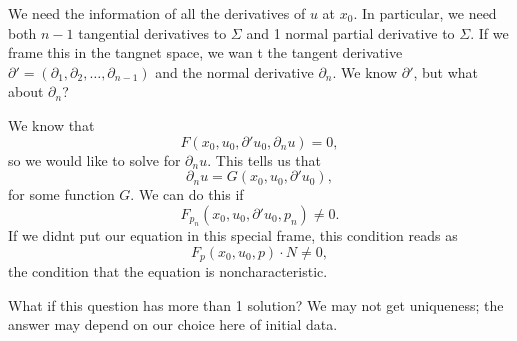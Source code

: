 We need the information of all the derivatives of $u$ at $x_0$. In particular, we need both $n-1$ tangential derivatives to $\Sigma$ and 1 normal partial derivative to $\Sigma$. If we frame this in the tangnet space, we wan t the tangent derivative $\partial'=(\partial_1, \partial_2, \ldots,\partial_{n-1} )$ and the normal derivative $\partial_n$. We know $\partial'$, but what about $\partial_n$? 
\begin{figure}[H]
    \centering
\end{figure}
We know that 
\[
    F(x_0, u_0 , \partial'u_0 , \partial_n u) = 0,
\]
so we would like to solve for $\partial_n u$. This tells us that 
\[
    \partial_n u = G(x_0, u_0, \partial'u_0),
\]
for some function $G$. We can do this if 
\[
    F_{p_n}(x_0, u_0, \partial' u_0, p_n) \neq 0.
\]
If we didnt put our equation in this special frame, this condition reads as 
\[
    F_p(x_0,u_0,p)\cdot N \neq 0,
\]
the condition that the equation is noncharacteristic.

\begin{remark}
    What if this question has more than 1 solution? We may not get uniqueness; the answer may depend on our choice here of initial data.
\end{remark}

